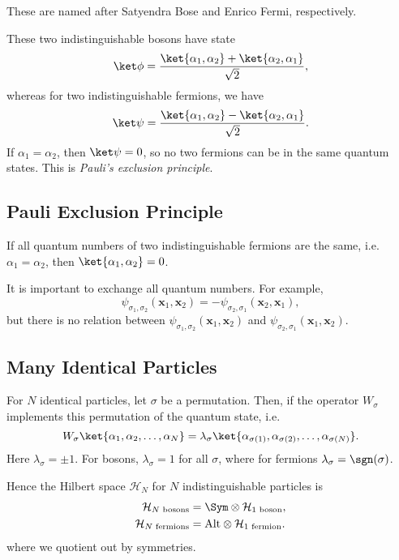 \documentclass[12pt]{article}
\begin{document}
These are named after Satyendra Bose and Enrico Fermi, respectively.

These two indistinguishable bosons have state
\[
	\ket \phi = \frac{\ket{\alpha_1, \alpha_2} + \ket{\alpha_2, \alpha_1}}{\sqrt 2},
\]
whereas for two indistinguishable fermions, we have
\[
	\ket \psi = \frac{\ket{\alpha_1, \alpha_2} - \ket{\alpha_2, \alpha_1}}{\sqrt 2}.
\]
If $\alpha_1 = \alpha_2$, then $\ket \psi = 0$, so no two fermions can be in the same quantum states. This is \emph{Pauli's exclusion principle}.


\subsection{Pauli Exclusion Principle}
\label{sub:pauli_exc}

If all quantum numbers of two indistinguishable fermions are the same, i.e. $\alpha_1 = \alpha_2$, then $\ket{\alpha_1, \alpha_2} = 0$.

It is important to exchange all quantum numbers. For example,
\[
\psi_{\sigma_1, \sigma_2}(\mathbf{x}_1, \mathbf{x}_2) = - \psi_{\sigma_2, \sigma_1}(\mathbf{x}_2, \mathbf{x}_1),
\]
but there is no relation between $\psi_{\sigma_1, \sigma_2}(\mathbf{x}_1, \mathbf{x}_2)$ and $\psi_{\sigma_2, \sigma_1}(\mathbf{x}_1, \mathbf{x}_2)$.

\subsection{Many Identical Particles}
\label{sub:many_part}

For $N$ identical particles, let $\sigma$ be a permutation. Then, if the operator $W_\sigma$ implements this permutation of the quantum state, i.e.
\[
	W_\sigma \ket{\alpha_1, \alpha_2, \ldots, \alpha_N} = \lambda_\sigma \ket{\alpha_{\sigma(1)}, \alpha_{\sigma(2)}, \ldots, \alpha_{\sigma(N)}}.
\]
Here $\lambda_\sigma = \pm 1$. For bosons, $\lambda_\sigma = 1$ for all $\sigma$, where for fermions $\lambda_\sigma = \sgn(\sigma)$.

Hence the Hilbert space $\mathcal{H}_N$ for $N$ indistinguishable particles is
\begin{align*}
	\mathcal{H}_{N \text{ bosons}} &= \Sym \otimes \mathcal{H}_{1 \text{ boson}},\\
	\mathcal{H}_{N \text{ fermions}} &= \mathrm{Alt} \otimes \mathcal{H}_{1 \text{ fermion}}.
\end{align*}
where we quotient out by symmetries.
\end{document}
